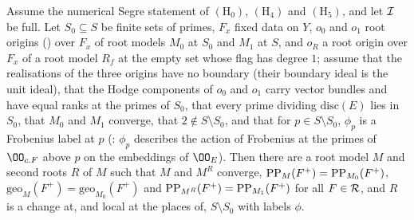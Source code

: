 \begin{proposition}\label{pf:volthm:prop:linkstep}
Assume the numerical Segre statement of $(\mathrm{H}_0)$, $(\mathrm{H}_4)$ and $(\mathrm{H}_5)$, and let $\mathcal{I}$ be
full. Let $S_0\subseteq S$ be finite sets of primes, $F_x$ fixed data on $Y$, $o_0$ and $o_1$ root origins
() over $F_x$ of root models $M_0$ at $S_0$ and $M_1$ at $S$, and
$o_R$ a root origin over $F_x$ of a root model $R_f$ at the empty set whose flag has degree $1$; assume that the
realisations of the three origins have no boundary (their boundary ideal is the unit ideal), that the Hodge components of $o_0$ and $o_1$ carry vector
bundles and have equal ranks at the primes of $S_0$, that every prime dividing $\mathrm{disc}(E)$ lies in $S_0$, that
$M_0$ and $M_1$ converge, that $2\notin S\setminus S_0$, and that for $p\in S\setminus S_0$, $\phi_p$ is a Frobenius
label at $p$ (: $\phi_p$ describes the action of Frobenius at
the primes of $\OO_{c.F}$ above $p$ on the embeddings of $\OO_E$). Then there are a root model $M$ and second roots $R$
of $M$ such that $M$ and $M^R$ converge, $\mathrm{PP}_M(F^+)=\mathrm{PP}_{M_0}(F^+)$,
$\mathrm{geo}_M(F^+)=\mathrm{geo}_{M_0}(F^+)$ and $\mathrm{PP}_{M^R}(F^+)=\mathrm{PP}_{M_1}(F^+)$ for all $F\in\mathcal{R}$,
and $R$ is a change at, and local at the places of, $S\setminus S_0$ with labels $\phi$.
\end{proposition}

